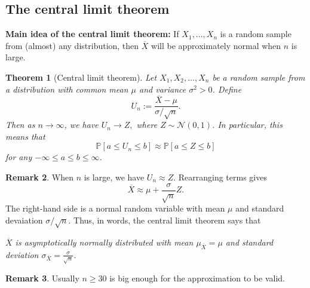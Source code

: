 \documentclass[10pt]{article}
\newtheorem{theorem}{Theorem}
\theoremstyle{definition}
\newtheorem{remark}[theorem]{Remark}
\newcommand{\vt}{\vskip 5mm} %
\newcommand{\Fl}{\vt\noindent\textbf} %
\newcommand{\1}[1]{\textbf{1}_{\left[#1\right]}} %
\def\P{\mathbb{P}} %
\begin{document}



\subsection{The central limit theorem}


\Fl{Main idea of the central limit theorem:} If  $X_{1},\ldots,X_{n}$ is a
random sample from (almost) any distribution, then $\overline{X}$ will be
approximately normal when $n$ is large.

\begin{theorem}[Central limit theorem]
  \label{thm:central-limit-theorem}
  Let $X_{1},X_{2},\ldots,X_{n}$ be a random sample from a distribution with
  common mean $\mu$ and variance $\sigma^{2}>0$.
  Define
  \begin{equation*}
    U_{n} := \frac{\overline{X}-\mu}{\sigma/\sqrt{n}}.
  \end{equation*}
  Then as $n \to \infty$, we have $U_{n} \to Z,$ where
  $Z\sim \mathcal{N}(0,1)$. In particular, this means that
  \begin{equation*}
    \P[a \leq U_{n}\leq b] \approx \P[a \leq Z \leq b]
  \end{equation*}
  for any $-\infty \leq a \leq b \leq \infty$.
\end{theorem}

\begin{remark}
  When $n$ is large, we have $U_{n}\approx Z$. Rearranging terms gives
  \begin{equation}\label{eq:20}
    \overline{X} \approx \mu + \frac{\sigma}{\sqrt{n}}Z.
  \end{equation}
  The right-hand side is a normal random variable with mean $\mu$ and standard
  devaiation $\sigma/\sqrt{n}$. Thus, in words, the central limit theorem says
  that
  \begin{center}
    \textit{$\overline{X}$ is asymptotically normally distributed with mean
      $\mu_{\overline{X}}=\mu$ and standard deviation $\sigma_{\overline{X}}=\frac{\sigma}{\sqrt{n}}$.}
  \end{center}
\end{remark}

\begin{remark}
  Usually $n \geq 30$ is big enough for the approximation to be valid.
\end{remark}
\end{document}
